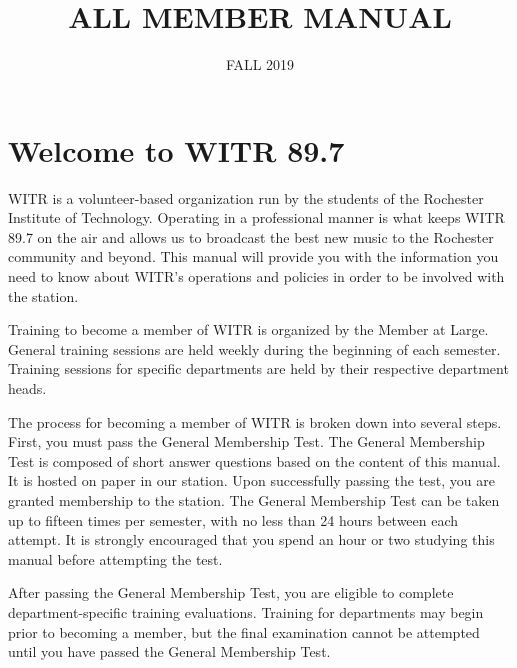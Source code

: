 \documentclass{witrman}
\date{FALL 2019}
\title{ALL MEMBER MANUAL}
\begin{document}
\maketitle  %

\maketoc{}  %

\setpagebg{}

\mbox{}
\vspace{16pt}
\chapter{Welcome to WITR 89.7}

WITR is a volunteer-based organization run by the students of the Rochester
Institute of Technology.  Operating in a professional manner is what keeps WITR
89.7 on the air and allows us to broadcast the best new music to the Rochester
community and beyond.  This manual will provide you with the information you
need to know about WITR’s operations and policies in order to be involved with
the station.

Training to become a member of WITR is organized by the Member at Large.
General training sessions are held weekly during the beginning of each semester.
Training sessions for specific departments are held by their respective
department heads.

The process for becoming a member of WITR is broken down into several steps.
First, you must pass the General Membership Test.  The General Membership Test
is composed of short answer questions based on the content of this manual.  It
is hosted on paper in our station.  Upon successfully passing the test, you are
granted membership to the station.  The General Membership Test can be taken up
to fifteen times per semester, with no less than 24 hours between each attempt.
It is strongly encouraged that you spend an hour or two studying this manual
before attempting the test.

After passing the General Membership Test, you are eligible to complete
department-specific training evaluations.  Training for departments may begin
prior to becoming a member, but the final examination cannot be attempted until
you have passed the General Membership Test.
\end{document}
